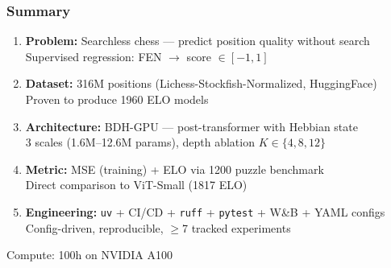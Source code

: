\documentclass{beamer}
\begin{document}
\begin{frame}
\frametitle{Summary}

\begin{enumerate}
    \item \textbf{Problem:} Searchless chess --- predict position quality without search\\
    {\footnotesize Supervised regression: FEN $\rightarrow$ score $\in [-1, 1]$}
    
    \vspace{0.5em}
    \item \textbf{Dataset:} 316M positions (Lichess-Stockfish-Normalized, HuggingFace)\\
    {\footnotesize Proven to produce 1960 ELO models}
    
    \vspace{0.5em}
    \item \textbf{Architecture:} BDH-GPU --- post-transformer with Hebbian state\\
    {\footnotesize 3 scales (1.6M--12.6M params), depth ablation $K \in \{4, 8, 12\}$}
    
    \vspace{0.5em}
    \item \textbf{Metric:} MSE (training) + ELO via 1200 puzzle benchmark\\
    {\footnotesize Direct comparison to ViT-Small (1817 ELO)}
    
    \vspace{0.5em}
    \item \textbf{Engineering:} \texttt{uv} + CI/CD + \texttt{ruff} + \texttt{pytest} + W\&B + YAML configs\\
    {\footnotesize Config-driven, reproducible, $\geq$7 tracked experiments}
\end{enumerate}

\vspace{0.5em}
\begin{center}
\large\alert{Compute: 100h on NVIDIA A100}
\end{center}

\end{frame}
\end{document}

